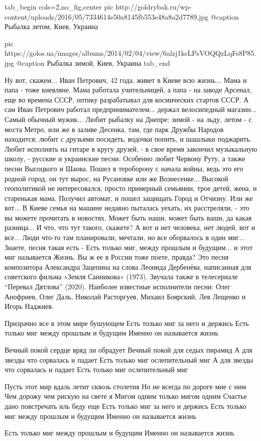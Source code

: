 \ifcmt
  tab_begin cols=2,no_fig,center
		 pic http://goldrybak.ru/wp-content/uploads/2016/05/7334614e50a8145fb553e48a8a2d7789.jpg
		 @caption Рыбалка летом, Киев, Украина

		 pic https://golos.ua/images/albums/2014/02/04/view/6alzj1ksLPsVOQQzLqFs8P85.jpg
		 @caption Рыбалка зимой, Киев, Украина
  tab_end
\fi

Ну вот, скажем...  Иван Петрович, 42 года, живет в Киеве всю жизнь... Мама и
папа - тоже киевляне.  Мама работала учительницей, а папа - на заводе Арсенал,
еще во времена СССР, оптику разрабатывал для космических стартов СССР.  А сам
Иван Петрович работал предпринимателем... держал велосипедный магазин... Самый
обычный мужик...  Любит рыбалку на Днепре; зимой - на льду, летом - с моста
Метро, или же в заливе Десенка, там, где парк Дружбы Народов находится; любит с
друзьями посидеть, водочки попить, и шашлыки поджарить.  Любит исполнять на
гитаре в кругу друзей, - в свое время закончил музыкальную школу, - русские и
украинские песни.  Особенно любит Червону Руту, а также песни Высоцкого и
Шаова.  Пошел в тероборону с начала войны, ведь это его родной город, он тут
вырос, на Русановке или же Вознесенке... Высокой геополитикой не интересовался,
просто примерный семьянин, трое детей, жена, и старенькая мама.  Получил
автомат, и пошел защищать Город и Отчизну. Или же вот... В Киеве семья на
машине недавно пыталась уехать, их расстреляли, - это вы можете прочитать в
новостях. Может быть наши, может быть ваши, да какая разница... И что, что тут
такого, скажете?  А вот и нет человека, нет людей, вот и все... Люди что-то там
планировали, мечтали, но все оборвалось в один миг...  Знаете, песня такая есть
- Есть только миг, между прошлым и будущим... и этот миг называется Жизнь. Вы ж
ее в России тоже поете, правда?  Это песня композитора Александра Зацепина на
слова Леонида Дербенёва, написанная для советского фильма «Земля Санникова»
(1973).  Звучала также в телесериале \enquote{Перевал Дятлова} (2020). Наиболее
известные исполнители песни: Олег Анофриев, Олег Даль, Николай Расторгуев,
Михаил Боярский, Лев Лещенко и Игорь Наджиев.

\raggedcolumns
\begin{multicols}{2} %
\setlength{\parindent}{0pt}
\obeycr
Призрачно все в этом мире бушующем
Есть только миг за него и держись
Есть только миг между прошлым и будущим
Именно он называется жизнь

Вечный покой сердце вряд ли обрадует
Вечный покой для седых пирамид
А для звезды что сорвалась и падает
Есть только миг ослепительный миг
А для звезды что сорвалась и падает
Есть только миг ослепительный миг

Пусть этот мир вдаль летит сквозь столетия
Но не всегда по дороге мне с ним
Чем дорожу чем рискую на свете я
Мигом одним только мигом одним
Счастье дано повстречать иль беду еще
Есть только миг за него и держись
Есть только миг между прошлым и будущим
Именно он называется жизнь

Есть только миг между прошлым и будущим
Именно он называется жизнь
\restorecr
\end{multicols} %

